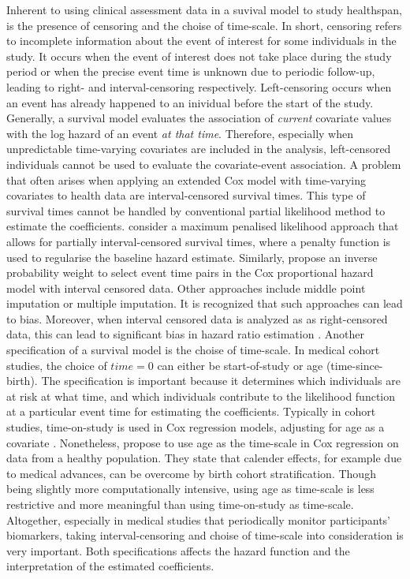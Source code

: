 Inherent to using clinical assessment data in a suvival model to study healthspan, is the presence of censoring and the choise of time-scale. In short, censoring refers to incomplete information about the event of interest for some individuals in the study. It occurs when the event of interest does not take place during the study period or when the precise event time is unknown due to periodic follow-up, leading to right- and interval-censoring respectively. Left-censoring occurs when an event has already happened to an inividual before the start of the study. Generally, a survival model evaluates the association of \textit{current} covariate values with the log hazard of an event \textit{at that time}. Therefore, especially when unpredictable time-varying covariates are included in the analysis, left-censored individuals cannot be used to evaluate the covariate-event association. A problem that often arises when applying an extended Cox model with time-varying covariates to health data are interval-censored survival times. This type of survival times cannot be handled by conventional partial likelihood method to estimate the coefficients. \cite{webb2023cox} consider a maximum penalised likelihood approach that allows for partially interval-censored survival times, where a penalty function is used to regularise the baseline hazard estimate. Similarly, \cite{heller2011proportional} propose an inverse probability weight to select event time pairs in the Cox proportional hazard model with interval censored data. Other approaches include middle point imputation or multiple imputation. It is recognized that such approaches can lead to bias. Moreover, when interval censored data is analyzed as as right-censored data, this can lead to significant bias in hazard ratio estimation \citep{sun2010comparison}. Another specification of a survival model is the choise of time-scale. In medical cohort studies, the choice of $\textit{time}=0$ can either be start-of-study or age (time-since-birth). The specification is important because it determines which individuals are at risk at what time, and which individuals contribute to the likelihood function at a particular event time for estimating the coefficients. Typically in cohort studies, time-on-study is used in Cox regression models, adjusting for age as a covariate \citep{canchola2003cox}. Nonetheless, \cite{kom1997time} propose to use age as the time-scale in Cox regression on data from a healthy population. They state that calender effects, for example due to medical advances, can be overcome by birth cohort stratification. Though being slightly more computationally intensive, using age as time-scale is less restrictive and more meaningful than using time-on-study as time-scale. Altogether, especially in medical studies that periodically monitor participants' biomarkers, taking interval-censoring and choise of time-scale into consideration is very important. Both specifications affects the hazard function and the interpretation of the estimated coefficients.


